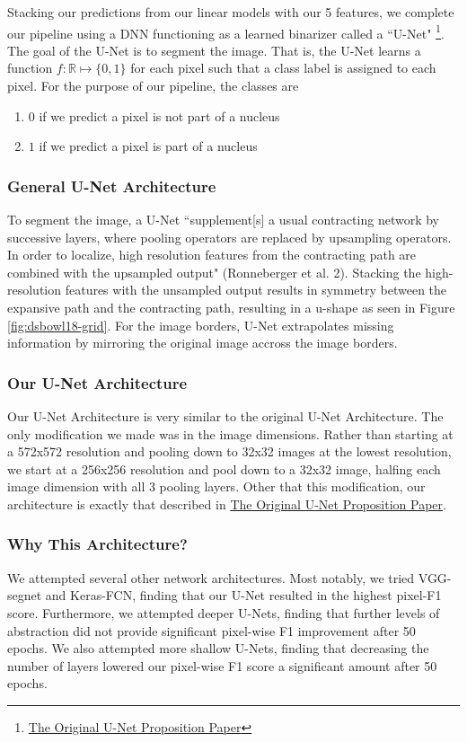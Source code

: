 \documentclass[paper=letter, fontsize=12pt]{article}
\numberwithin{equation}{section} %
\numberwithin{figure}{section} %
\numberwithin{table}{section} %
\begin{document}
Stacking our predictions from our linear models with our 5 features, we complete
our pipeline using a DNN functioning as a learned binarizer called a ``U-Net"
\footnote{\href{https://arxiv.org/pdf/1505.04597.pdf}{The Original U-Net Proposition Paper}}.
The goal of the U-Net is to segment the image. That is, the U-Net learns a function
$f : \mathbb{R} \mapsto \{0, 1\}$ for each pixel such that a class label is assigned
to each pixel. For the purpose of our pipeline, the classes are
\begin{enumerate}
  \item $0$ if we predict a pixel is not part of a nucleus
  \item $1$ if we predict a pixel is part of a nucleus
\end{enumerate}

 \subsubsection{General U-Net Architecture}
 To segment the image, a U-Net ``supplement[s] a usual contracting network by
 successive layers, where pooling operators are replaced by upsampling
 operators. In order to localize, high resolution features from the contracting
 path are combined with the upsampled output" (Ronneberger et al. 2). Stacking the
 high-resolution features with the unsampled output results in symmetry
 between the expansive path and the contracting path, resulting in a u-shape
 as seen in Figure \ref{fig:dsbowl18-grid}. For the image
 borders, U-Net extrapolates missing information by mirroring the original
 image accross the image borders.

 \subsubsection{Our U-Net Architecture}
 Our U-Net Architecture is very similar to the original U-Net Architecture. The only
 modification we made was in the image dimensions. Rather than starting at a 572x572
 resolution and pooling down to 32x32 images at the lowest resolution, we start at
 a 256x256 resolution and pool down to a 32x32 image, halfing each image dimension
 with all 3 pooling layers. Other that this modification, our architecture is exactly
 that described in \href{https://arxiv.org/pdf/1505.04597.pdf}{The Original U-Net Proposition Paper}.

 \subsubsection{Why This Architecture?}
 We attempted several other network architectures. Most notably, we tried VGG-segnet and Keras-FCN,
 finding that our U-Net resulted in the highest pixel-F1 score. Furthermore, we attempted deeper
 U-Nets, finding that further levels of abstraction did not provide significant pixel-wise F1
 improvement after 50 epochs. We also attempted more shallow U-Nets, finding that decreasing the
 number of layers lowered our pixel-wise F1 score a significant amount after 50 epochs.
\end{document}
